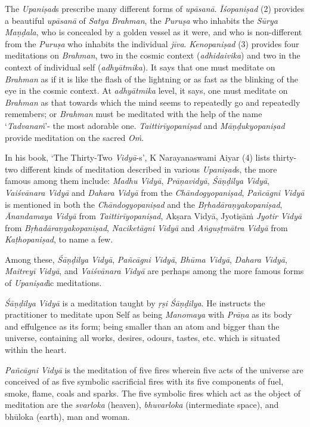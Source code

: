 The \emph{Upaniṣad}s prescribe many different forms of \emph{upāsanā}. \emph{Īśopaniṣad} (2) provides a beautiful \emph{upāsanā} of \emph{Satya} \emph{Brahman}, the \emph{Puruṣa} who inhabits the \emph{Sūrya} \emph{Maṇḍala}, who is concealed by a golden vessel as it were, and who is non-different from the \emph{Puruṣa} who inhabits the individual \emph{jīva}. \emph{Kenopaniṣad} (3) provides four meditations on \emph{Brahman}, two in the cosmic context (\emph{adhidaivika}) and two in the context of individual self (\emph{adhyātmika}). It says that one must meditate on \emph{Brahman} as if it is like the flash of the lightning or as fast as the blinking of the eye in the cosmic context. At \emph{adhyātmika} level, it says, one must meditate on \emph{Brahman} as that towards which the mind seems to repeatedly go and repeatedly remembers; or \emph{Brahman} must be meditated with the help of the name `\emph{Tadvanaṁ}'- the most adorable one. \emph{Taittirīyopaniṣad} and \emph{Māṇḍukyopaniṣad} provide meditation on the sacred \emph{Oṁ}.

In his book, `The Thirty-Two \emph{Vidyā}-s', K Narayanaswami Aiyar (4) lists thirty-two different kinds of meditation described in various \emph{Upaniṣad}s, the more famous among them include: \emph{Madhu} \emph{Vidyā}, \emph{Prāṇavidyā}, \emph{Śāṇḍilya} \emph{Vidyā}, \emph{Vaiśvānara} \emph{Vidyā} and \emph{Dahara} \emph{Vidyā} from the \emph{Chāndogyopaniṣad}, \emph{Pañcāgni Vidyā} is mentioned in both the \emph{Chāndogyopaniṣad} and the \emph{Bṛhadāraṇyakopaniṣad}, \emph{Ānandamaya Vidyā} from \emph{Taittirīyopaniṣad}, Akṣara Vidyā, Jyotiṣāṁ \emph{Jyotir Vidyā} from \emph{Bṛhadāraṇyakopaniṣad}, \emph{Naciketāgni} \emph{Vidyā} and \emph{Aṅguṣṭmātra Vidyā} from \emph{Kaṭhopaniṣad}, to name a few.

Among these, \emph{Śāṇḍilya} \emph{Vidyā}, \emph{Pañcāgni Vidyā}, \emph{Bhūma Vidyā}, \emph{Dahara} \emph{Vidyā}, \emph{Maitreyī} \emph{Vidyā}, and \emph{Vaiśvānara} \emph{Vidyā} are perhaps among the more famous forms of \emph{Upaniṣad}ic meditations.

\emph{Śāṇḍilya} \emph{Vidyā} is a meditation taught by \emph{ṛṣi} \emph{Śāṇḍilya}. He instructs the practitioner to meditate upon Self as being \emph{Manomaya} with \emph{Prāṇa} as its body and effulgence as its form; being smaller than an atom and bigger than the universe, containing all works, desires, odours, tastes, etc. which is situated within the heart.

\emph{Pañcāgni} \emph{Vidyā} is the meditation of five fires wherein five acts of the universe are conceived of as five symbolic sacrificial fires with its five components of fuel, smoke, flame, coals and sparks. The five symbolic fires which act as the object of meditation are the \emph{svarloka} (heaven), \emph{bhuvarloka} (intermediate space), and bhūloka (earth), man and woman.

